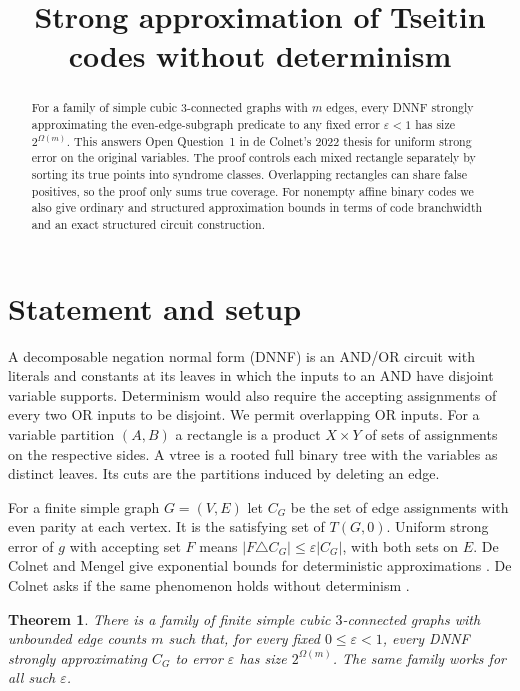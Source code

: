 \documentclass[11pt,a4paper]{amsart}
\title[Strong approximation of Tseitin codes]{Strong approximation of Tseitin codes without determinism}
\date{}
\newtheorem{theorem}{Theorem}
\begin{document}
\begin{abstract}
For a family of simple cubic $3$-connected graphs with $m$ edges, every DNNF strongly approximating the even-edge-subgraph predicate to any fixed error $\varepsilon<1$ has size $2^{\Omega(m)}$. This answers Open Question~1 in de Colnet's 2022 thesis for uniform strong error on the original variables. The proof controls each mixed rectangle separately by sorting its true points into syndrome classes. Overlapping rectangles can share false positives, so the proof only sums true coverage. For nonempty affine binary codes we also give ordinary and structured approximation bounds in terms of code branchwidth and an exact structured circuit construction.
\end{abstract}
\maketitle

\section{Statement and setup}
A decomposable negation normal form (DNNF) is an AND/OR circuit with literals and constants at its leaves in which the inputs to an AND have disjoint variable supports. Determinism would also require the accepting assignments of every two OR inputs to be disjoint. We permit overlapping OR inputs. For a variable partition $(A,B)$ a rectangle is a product $X\times Y$ of sets of assignments on the respective sides. A vtree is a rooted full binary tree with the variables as distinct leaves. Its cuts are the partitions induced by deleting an edge.

For a finite simple graph $G=(V,E)$ let $C_G$ be the set of edge assignments with even parity at each vertex. It is the satisfying set of $T(G,0)$. Uniform strong error of $g$ with accepting set $F$ means $|F\triangle C_G|\leq \varepsilon|C_G|$, with both sets on $E$. De Colnet and Mengel give exponential bounds for deterministic approximations \cite{approx}. De Colnet asks if the same phenomenon holds without determinism \cite[\S2.5, Open Question~1]{thesis}.

\begin{theorem}\label{theorem:tseitin}
There is a family of finite simple cubic $3$-connected graphs with unbounded edge counts $m$ such that, for every fixed $0\leq\varepsilon<1$, every DNNF strongly approximating $C_G$ to error $\varepsilon$ has size $2^{\Omega(m)}$. The same family works for all such $\varepsilon$.
\end{theorem}
\end{document}
